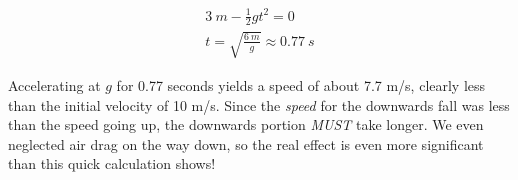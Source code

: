 \begin{align}
\SI{3}{m} - \frac{1}{2} g t^2 = 0\\
t = \sqrt{\frac{\SI{6}{m}}{g}} \approx \SI{0.77}{s}
\end{align}

Accelerating at $g$ for 0.77 seconds yields a speed of about 7.7 m/s, clearly less than the initial velocity of 10 m/s. Since the \emph{speed} for the downwards fall was less than the speed going up, the downwards portion \emph{MUST} take longer. We even neglected air drag on the way down, so the real effect is even more significant than this quick calculation shows!

